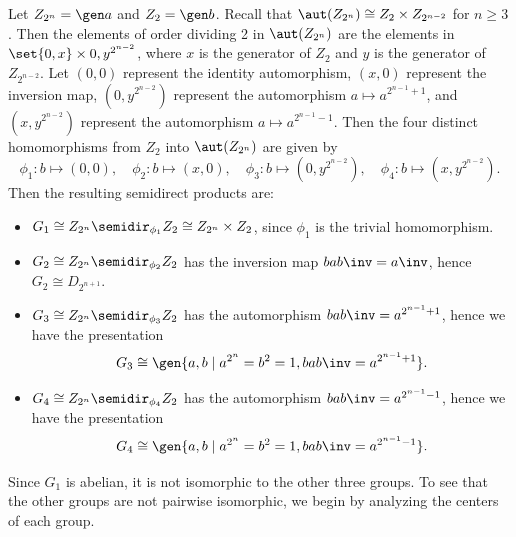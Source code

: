 \begin{sol}
    Let $Z_{2^n} = \gen a$ and $Z_2 = \gen b$. Recall that $\aut(Z_{2^n}) \cong Z_2 \times Z_{2^{n - 2}}$ for $n \geq 3$. Then the elements of order dividing 2 in $\aut(Z_{2^n})$ are the elements in $\set{0, x} \times {0, y^{2^{n - 2}}}$, where $x$ is the generator of $Z_2$ and $y$ is the generator of $Z_{2^{n - 2}}$. Let $(0, 0)$ represent the identity automorphism, $(x, 0)$ represent the inversion map, $(0, y^{2^{n - 2}})$ represent the automorphism $a \mapsto a^{2^{n - 1} + 1}$, and $(x, y^{2^{n - 2}})$ represent the automorphism $a \mapsto a^{2^{n - 1} - 1}$. Then the four distinct homomorphisms from $Z_2$ into $\aut(Z_{2^n})$ are given by
    \[\phi_1 : b \mapsto (0, 0), \quad \phi_2 : b \mapsto (x, 0), \quad \phi_3 : b \mapsto (0, y^{2^{n - 2}}), \quad \phi_4 : b \mapsto (x, y^{2^{n - 2}}).\]
    Then the resulting semidirect products are:
    \begin{itemize}
        \item $G_1 \cong Z_{2^n} \semidir_{\phi_1} Z_2 \cong Z_{2^n} \times Z_2$, since $\phi_1$ is the trivial homomorphism.
        \item $G_2 \cong Z_{2^n} \semidir_{\phi_2} Z_2$ has the inversion map $bab\inv = a\inv$, hence $G_2 \cong D_{2^{n + 1}}$.
        \item $G_3 \cong Z_{2^n} \semidir_{\phi_3} Z_2$ has the automorphism $bab\inv = a^{2^{n - 1} + 1}$, hence we have the presentation
        \[G_3 \cong \gen{a, b \mid a^{2^n} = b^2 = 1, bab\inv = a^{2^{n - 1} + 1}}.\]
        \item $G_4 \cong Z_{2^n} \semidir_{\phi_4} Z_2$ has the automorphism $bab\inv = a^{2^{n - 1} - 1}$, hence we have the presentation
        \[G_4 \cong \gen{a, b \mid a^{2^n} = b^2 = 1, bab\inv = a^{2^{n - 1} - 1}}.\]
    \end{itemize}
    Since $G_1$ is abelian, it is not isomorphic to the other three groups. To see that the other groups are not pairwise isomorphic, we begin by analyzing the centers of each group.


\end{sol}
